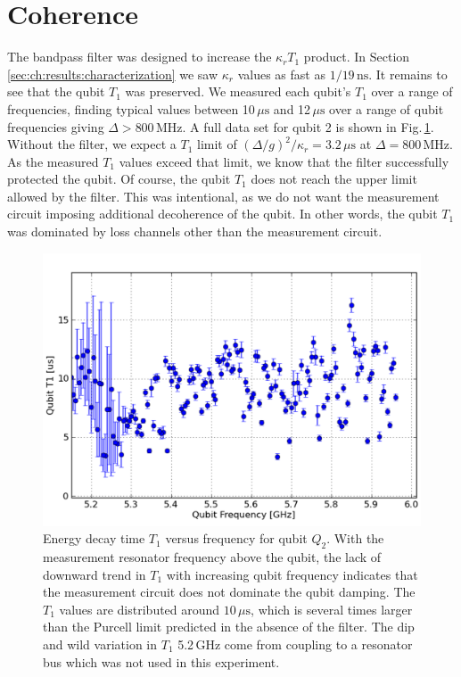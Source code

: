 \section{Coherence}

The bandpass filter was designed to increase the $\kappa_r T_1$ product.
In Section \ref{sec:ch:results:characterization} we saw $\kappa_r$ values as fast as $1/19\,\text{ns}$.
It remains to see that the qubit $T_1$ was preserved.
We measured each qubit's $T_1$ over a range of frequencies, finding typical values between 10\,$\mu\text{s}$ and 12\,$\mu\text{s}$ over a range of qubit frequencies giving $\Delta > 800\,\text{MHz}$.
A full data set for qubit 2 is shown in Fig.\,\ref{Fig:ch:results:sec:coherence:swapSpectroscopyQ2}.
Without the filter, we expect a $T_1$ limit of $(\Delta/g)^2 / \kappa_r = 3.2\,\mu\text{s}$ at $\Delta=800\,\text{MHz}$.
As the measured $T_1$ values exceed that limit, we know that the filter successfully protected the qubit.
Of course, the qubit $T_1$ does not reach the upper limit allowed by the filter.
This was intentional, as we do not want the measurement circuit imposing additional decoherence of the qubit.
In other words, the qubit $T_1$ was dominated by loss channels other than the measurement circuit.

\begin{figure}
\begin{centering}
\includegraphics[width=\textwidth]{coherence.png}
\par\end{centering}
\caption{Energy decay time $T_1$ versus frequency for qubit $Q_2$.
With the measurement resonator frequency above the qubit, the lack of downward trend in $T_1$ with increasing qubit frequency indicates that the measurement circuit does not dominate the qubit damping.
The $T_1$ values are distributed around $10\,\mu\text{s}$, which is several times larger than the Purcell limit predicted in the absence of the filter.
The dip and wild variation in $T_1$ 5.2\,GHz come from coupling to a resonator bus which was not used in this experiment.}
\label{Fig:ch:results:sec:coherence:swapSpectroscopyQ2}
\end{figure}
